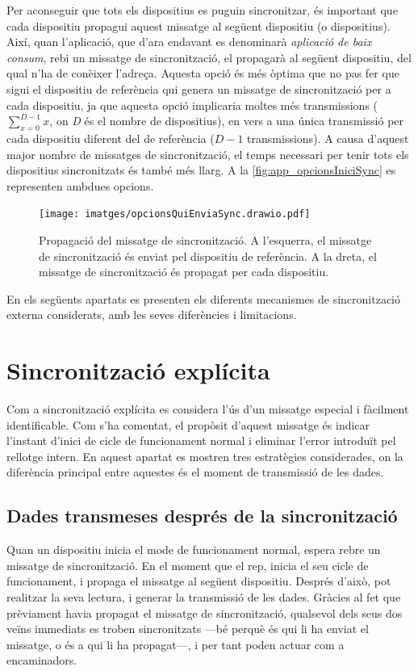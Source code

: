 \documentclass{tfgitic}[2024/07/01]
\begin{document}
{Per aconseguir que tots els dispositius es puguin sincronitzar, és important que cada dispositiu propagui aquest missatge al següent dispositiu (o dispositius). Així, quan l'aplicació, que d'ara endavant es denominarà \emph{aplicació de baix consum}, rebi un missatge de sincronització, el propagarà al següent dispositiu, del qual n'ha de conèixer l'adreça. Aquesta opció és més òptima que no pas fer que sigui el dispositiu de referència qui genera un missatge de sincronització per a cada dispositiu, ja que aquesta opció implicaria moltes més transmissions ($\sum_{x=0}^{D-1}{x}$, on \emph{D} és el nombre de dispositius), en vers a una única transmissió per cada dispositiu diferent del de referència ($D-1$ transmissions). A causa d'aquest major nombre de missatges de sincronització, el temps necessari per tenir tots els dispositius sincronitzats és també més llarg. A la \autoref{fig:app_opcionsIniciSync} es representen ambdues opcions.

\begin{figure}
    \centering
    \texttt{[image: imatges/opcionsQuiEnviaSync.drawio.pdf]}
    \caption{Propagació del missatge de sincronització. A l'esquerra, el missatge de sincronització és enviat pel dispositiu de referència. A la dreta, el missatge de sincronització és propagat per cada dispositiu.}
\label{fig:app_opcionsIniciSync}
\end{figure}

En els següents apartats es presenten els diferents mecanismes de sincronització externa considerats, amb les seves diferències i limitacions.

\section{Sincronització explícita}
Com a sincronització explícita es considera l'ús d'un missatge especial i fàcilment identificable. Com s'ha comentat, el propòsit d'aquest missatge és indicar l'instant d'inici de cicle de funcionament normal i eliminar l'error introduït pel rellotge intern. En aquest apartat es mostren tres estratègies considerades, on la diferència principal entre aquestes és el moment de transmissió de les dades.

\subsection{Dades transmeses després de la sincronització}
Quan un dispositiu inicia el mode de funcionament normal, espera rebre un missatge de sincronització. En el moment que el rep, inicia el seu cicle de funcionament, i propaga el missatge al següent dispositiu. Després d'això, pot realitzar la seva lectura, i generar la transmissió de les dades. Gràcies al fet que prèviament havia propagat el missatge de sincronització, qualsevol dels seus dos veïns immediats es troben sincronitzats ---bé perquè és qui li ha enviat el missatge, o és a qui li ha propagat---, i per tant poden actuar com a encaminadors.

}
\end{document}
